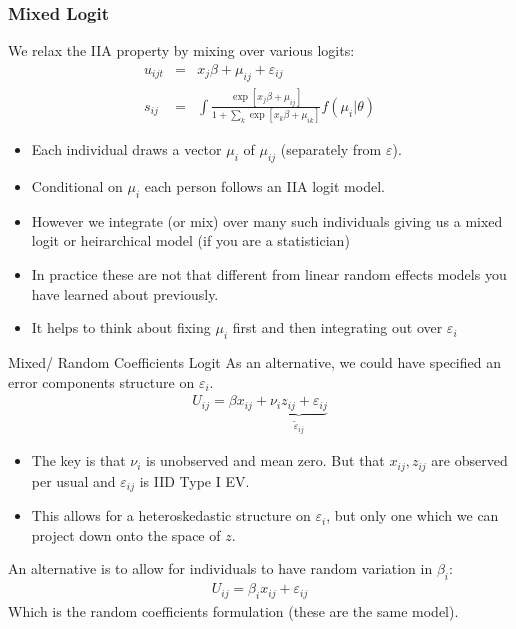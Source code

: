 \documentclass[xcolor=pdftex,dvipsnames,table,mathserif]{beamer}
\begin{document}
\begin{frame}
\frametitle{Mixed Logit}
We relax the IIA property by mixing over various logits:
\begin{eqnarray*}
u_{ijt} &=& x_j \beta + \mu_{ij} + \varepsilon_{ij} \\
s_{ij} &=& \int \frac{\exp[x_{j} \beta + \mu_{ij} ]}{1+\sum_k \exp[x_{k} \beta + \mu_{ik} ]} f(\mu_i | \theta)
\end{eqnarray*}
 \begin{itemize}
 \item Each individual draws a vector $\mu_i$ of $\mu_{ij}$ (separately from $\varepsilon$).
 \item Conditional on $\mu_i$ each person follows an IIA logit model.
 \item However we integrate (or mix) over many such individuals giving us a \alert{mixed logit} or \alert{heirarchical model} (if you are a statistician)
 \item In practice these are not that different from linear \alert{random effects models} you have learned about previously.
 \item It helps to think about fixing $\mu_i$ first and then integrating out over $\varepsilon_i$
 \end{itemize}
\end{frame}

\begin{frame}{Mixed/ Random Coefficients Logit}
As an alternative, we could have specified an error components structure on $\varepsilon_i$.
\begin{eqnarray*}
U_{ij} = \beta x_{ij} + \underbrace{\nu_i z_{ij} + \varepsilon_{ij}}_{\tilde{\varepsilon}_{ij}}
\end{eqnarray*}
\begin{itemize}
\item The key is that $\nu_i$ is unobserved and mean zero. But that $x_{ij},z_{ij}$ are observed per usual and $\varepsilon_{ij}$ is IID Type I EV.
\item This allows for a heteroskedastic structure on $\varepsilon_{i}$, but only one which we can project down onto the space of $z$.
\end{itemize}
An alternative is to allow for individuals to have random variation in $\beta_i$:
\begin{eqnarray*}
U_{ij} = \beta_i x_{ij} +  \varepsilon_{ij}
\end{eqnarray*}
Which is the random coefficients formulation (these are the same model).
\end{frame}
\end{document}
